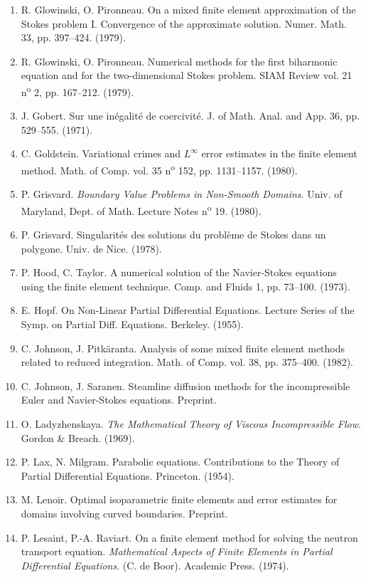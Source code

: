 \begin{enumerate}
\item R. Glowinski, O. Pironneau. On a mixed finite element approximation of the Stokes problem I. Convergence of the approximate solution. Numer. Math. 33, pp. 397--424. (1979).
\item {}R. Glowinski, O. Pironneau. Numerical methods for the first biharmonic equation and for the two-dimensional Stokes problem. SIAM Review vol. 21 n\textsuperscript{o} 2, pp. 167--212. (1979).
\item J. Gobert. Sur une inégalité de coercivité. J. of Math. Anal. and App. 36, pp. 529--555. (1971).
\item C. Goldstein. Variational crimes and $L^{\infty}$ error estimates in the finite element method. Math. of Comp. vol. 35 n\textsuperscript{o} 152, pp. 1131--1157. (1980).
\item {}P. Grisvard. \textit{Boundary Value Problems in Non-Smooth Domains}. Univ. of Maryland, Dept. of Math. Lecture Notes n\textsuperscript{o} 19. (1980).
\item P. Grisvard. Singularités des solutions du problème de Stokes dans un polygone. Univ. de Nice. (1978).
\item P. Hood, C. Taylor. A numerical solution of the Navier-Stokes equations using the finite element technique. Comp. and Fluids 1, pp. 73--100. (1973).
\item {}E. Hopf. On Non-Linear Partial Differential Equations. Lecture Series of the Symp. on Partial Diff. Equations. Berkeley. (1955).
\item C. Johnson, J. Pitkäranta. Analysis of some mixed finite element methods related to reduced integration. Math. of Comp. vol. 38, pp. 375--400. (1982).
\item {}C. Johnson, J. Saranen. Steamline diffusion methods for the incompressible Euler and Navier-Stokes equations. Preprint.
\item O. Ladyzhenskaya. \textit{The Mathematical Theory of Viscous Incompressible Flow}. Gordon \& Breach. (1969).
\item P. Lax, N. Milgram. Parabolic equations. Contributions to the Theory of Partial Differential Equations. Princeton. (1954).
\item M. Lenoir. Optimal isoparametric finite elements and error estimates for domains involving curved boundaries. Preprint.
\item {}P. Lesaint, P.-A. Raviart. On a finite element method for solving the neutron transport equation. \textit{Mathematical Aspects of Finite Elements in Partial Differential Equations}. (C. de Boor). Academic Press. (1974).

\end{enumerate}
